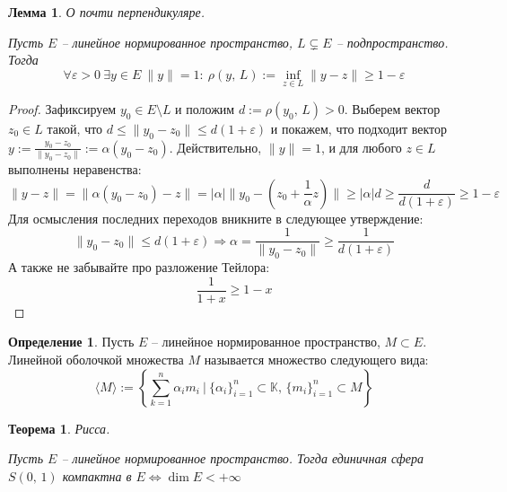 \documentclass[a4paper,12pt]{article}
\renewcommand{\leq}{\ensuremath{\leqslant}}
\renewcommand{\geq}{\ensuremath{\geqslant}}
\theoremstyle{plain}
\newtheorem{theorem}{Теорема}[section]
\newtheorem{lemma}{Лемма}[section]
\theoremstyle{definition}
\newtheorem{definition}{Определение}[section]
\theoremstyle{remark}
\begin{document}
\begin{lemma}
	О почти перпендикуляре.

	Пусть $E$ -- линейное нормированное пространство, $L \subsetneq E$ -- подпространство. Тогда
	\[
		\forall \varepsilon > 0 \: \exists y \in E \: \|y\| = 1 :\: \rho(y,\, L) := \inf_{z \in L} \|y - z\| \geq 1 - \varepsilon
	\]
\end{lemma}

\begin{proof}
	Зафиксируем $y_0 \in E \setminus L$ и положим $d := \rho(y_0,\, L) > 0$. Выберем вектор $z_0 \in L$ такой, что $d \leq \|y_0 - z_0\| \leq d(1 + \varepsilon)$ и покажем, что подходит вектор $y := \frac{y_0 - z_0}{\|y_0 - z_0\|} := \alpha(y_0 - z_0)$. Действительно, $\|y\| = 1$, и для любого $z \in L$ выполнены неравенства:
	\[
		\|y - z\| = \|\alpha(y_0 - z_0) - z\| = \vert\alpha\vert \|y_0 - \left(z_0 + \frac{1}{\alpha}z\right)\| \geq \vert\alpha\vert d \geq \frac{d}{d(1 + \varepsilon)} \geq 1 - \varepsilon
	\]
	Для осмысления последних переходов вникните в следующее утверждение:
	\[
		\|y_0 - z_0\| \leq d(1 + \varepsilon) \Rightarrow \alpha = \frac{1}{\|y_0 - z_0\|} \geq \frac{1}{d(1 + \varepsilon)}
	\]
	А также не забывайте про разложение Тейлора:
	\[
		\frac{1}{1 + x} \geq 1 - x
	\]
\end{proof}

\begin{definition}
  Пусть $E$ -- линейное нормированное пространство, $M \subset E$. Линейной оболочкой множества $M$ называется множество следующего вида:
  \[
    \langle M\rangle := \left\{\sum_{k = 1}^n\alpha_im_i \:\vert\: \{\alpha_i\}_{i = 1}^n \subset \mathbb{K},\, \{m_i\}_{i = 1}^n \subset M\right\}
  \]
\end{definition}

\begin{theorem}
	Рисса.

	Пусть $E$ -- линейное нормированное пространство. Тогда единичная сфера $S(0,\,1)$ компактна в $E \Leftrightarrow \dim E < +\infty$
\end{theorem}
\end{document}

